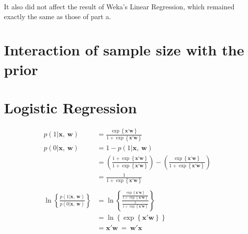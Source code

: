 \documentclass{article}
\begin{document}
It also did not affect the result of Weka's Linear Regression, which remained exactly the same as those of part a. 

\section{Interaction of sample size with the prior}

\section{Logistic Regression}
\begin{align*}
p(1|\bm{x},~\bm{w}) &= \frac{ \exp\left\{ \bm{x}'\bm{w} \right\} }{ 1+\exp\left\{ \bm{x}'\bm{w} \right\} }\\
p(0|\bm{x},~\bm{w}) &= 1-p(1|\bm{x},~\bm{w})\\
		    &= \left(\frac{1+ \exp\left\{ \bm{x}'\bm{w} \right\} }{ 1+\exp\left\{ \bm{x}'\bm{w} \right\} }\right)-\left(\frac{ \exp\left\{ \bm{x}'\bm{w} \right\} }{ 1+\exp\left\{ \bm{x}'\bm{w} \right\} }\right)\\
		    &= \frac{ 1 }{ 1+\exp\left\{ \bm{x}'\bm{w} \right\} }\\
		    &\nonumber\\
\ln\left\{ \frac{p(1|\bm{x},~\bm{w})}{p(0|\bm{x},~\bm{w})} \right\} &= \ln \left\{ 
	\frac{ \frac{ \exp\left\{ \bm{x}'\bm{w} \right\} }{ 1+\exp\left\{ \bm{x}'\bm{w} \right\} } }
	     { \frac{ 1 }{ 1+\exp\left\{ \bm{x}'\bm{w} \right\} } } 
	\right\}\\
		    &= \ln\left\{ \exp\left\{ \bm{x}'\bm{w} \right\} \right\}\\
		    &= \bm{x}'\bm{w}~=~\bm{w}'\bm{x}
\end{align*}
\end{document}
